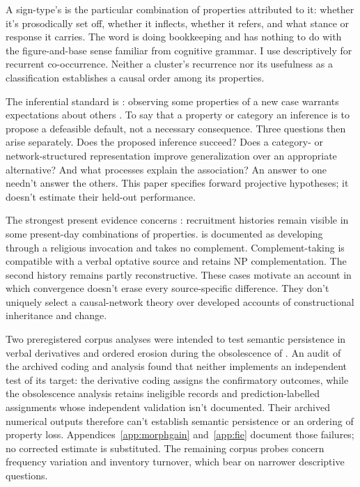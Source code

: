 \documentclass[12pt]{article}
\begin{document}
A sign-type's  is the particular combination of properties attributed to it: whether it's prosodically set off, whether it inflects, whether it refers, and what stance or response it carries. The word is doing bookkeeping and has nothing to do with the figure-and-base sense familiar from cognitive grammar. I use  descriptively for recurrent co-occurrence. Neither a cluster's recurrence nor its usefulness as a classification establishes a causal order among its properties.

The inferential standard is : observing some properties of a new case warrants expectations about others \citep{Goodman1955}. To say that a property or category  an inference is to propose a defeasible default, not a necessary consequence. Three questions then arise separately. Does the proposed inference succeed? Does a category- or network-structured representation improve generalization over an appropriate alternative? And what processes explain the association? An answer to one needn't answer the others. This paper specifies forward projective hypotheses; it doesn't estimate their held-out performance.

The strongest present evidence concerns : recruitment histories remain visible in some present-day combinations of properties.  is documented as developing through a religious invocation and takes no complement. Complement-taking  is compatible with a verbal optative source and retains NP complementation. The second history remains partly reconstructive. These cases motivate an account in which convergence doesn't erase every source-specific difference. They don't uniquely select a causal-network theory over developed accounts of constructional inheritance and change.

Two preregistered corpus analyses were intended to test semantic persistence in verbal derivatives and ordered erosion during the obsolescence of . An audit of the archived coding and analysis found that neither implements an independent test of its target: the derivative coding assigns the confirmatory outcomes, while the obsolescence analysis retains ineligible records and prediction-labelled assignments whose independent validation isn't documented. Their archived numerical outputs therefore can't establish semantic persistence or an ordering of property loss. Appendices~\ref{app:morphgain} and~\ref{app:fie} document those failures; no corrected estimate is substituted. The remaining corpus probes concern frequency variation and inventory turnover, which bear on narrower descriptive questions.
\end{document}
